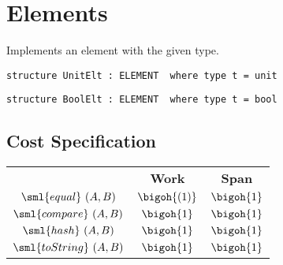 \chapter{Elements}
\label{ch:elt-structures}

\begin{cluster}
\label{grp:prmbl:elt-structures::implements}

\begin{preamble}
\label{prmbl:elt-structures::implements}
Implements an element with the given type.

\begin{verbatim}
structure UnitElt : ELEMENT  where type t = unit
\end{verbatim}

\begin{verbatim}
structure BoolElt : ELEMENT  where type t = bool
\end{verbatim}

\end{preamble}
\end{cluster}


\section{Cost Specification}
\label{sec:elt-structures::cost-specification}

\begin{cluster}
\label{grp:cost:unit}

\begin{costspec}[UnitElt]
\label{cost:unit}
\begin{tabular}{c|c|c}
& \textbf{Work} & \textbf{Span} \\
$\sml{equal}~(A,B)$ & $\bigoh {(1)}$ & $\bigoh {1}$ \\
$\sml{compare}~(A,B)$ & $\bigoh {1}$ & $\bigoh {1}$ \\
$\sml{hash}~(A,B)$ & $\bigoh {1}$ & $\bigoh {1}$ \\
$\sml{toString}~(A,B)$ & $\bigoh {1}$ & $\bigoh {1}$ \\
\end{tabular}

\end{costspec}
\end{cluster}

